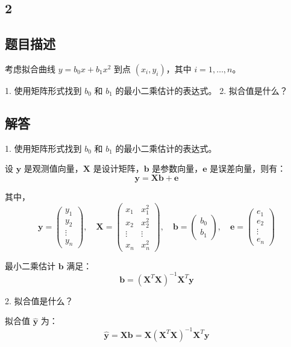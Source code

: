 \documentclass[UTF8]{report}
\theoremstyle{MyLineTheoremStyle} %
\theoremstyle{MyBlockTheoremStyle} %
\theoremstyle{MySubsubsectionStyle} %
\begin{document}
\subsection{2}
\subsection*{题目描述}

考虑拟合曲线 $y = b_0 x + b_1 x^2$ 到点 $(x_i, y_i)$，其中 $i = 1, \ldots, n$。

1. 使用矩阵形式找到 $b_0$ 和 $b_1$ 的最小二乘估计的表达式。
2. 拟合值是什么？

\subsection*{解答}

1. 使用矩阵形式找到 $b_0$ 和 $b_1$ 的最小二乘估计的表达式。

设 $\mathbf{y}$ 是观测值向量，$\mathbf{X}$ 是设计矩阵，$\mathbf{b}$ 是参数向量，$\mathbf{e}$ 是误差向量，则有：
\[
\mathbf{y} = \mathbf{X} \mathbf{b} + \mathbf{e}
\]

其中，
\[
\mathbf{y} = \begin{pmatrix} y_1 \\ y_2 \\ \vdots \\ y_n \end{pmatrix}, \quad \mathbf{X} = \begin{pmatrix} x_1 & x_1^2 \\ x_2 & x_2^2 \\ \vdots & \vdots \\ x_n & x_n^2 \end{pmatrix}, \quad \mathbf{b} = \begin{pmatrix} b_0 \\ b_1 \end{pmatrix}, \quad \mathbf{e} = \begin{pmatrix} e_1 \\ e_2 \\ \vdots \\ e_n \end{pmatrix}
\]

最小二乘估计 $\mathbf{b}$ 满足：
\[
\mathbf{b} = (\mathbf{X}^T \mathbf{X})^{-1} \mathbf{X}^T \mathbf{y}
\]

2. 拟合值是什么？

拟合值 $\hat{\mathbf{y}}$ 为：
\[
\hat{\mathbf{y}} = \mathbf{X} \mathbf{b} = \mathbf{X} (\mathbf{X}^T \mathbf{X})^{-1} \mathbf{X}^T \mathbf{y}
\]
\end{document}
